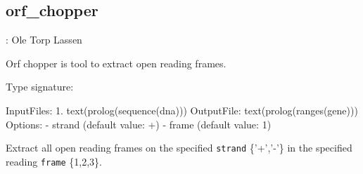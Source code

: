 


\subsection{orf_chopper}

\label{sec:orfchopper}

\begin{tags}
: Ole Torp Lassen
\end{tags}

Orf chopper is tool to extract open reading frames.\vspace{0.7cm}

\begin{description}
Type signature:

\begin{code}
InputFiles:
    1. text(prolog(sequence(dna)))
OutputFile:
    text(prolog(ranges(gene)))
Options:
    - strand (default value: +)
    - frame (default value: 1)
\end{code}

Extract all open reading frames on the specified \verb$strand$ \{'+','-'\} in the specified reading \verb$frame$ \{1,2,3\}.
\end{description}

